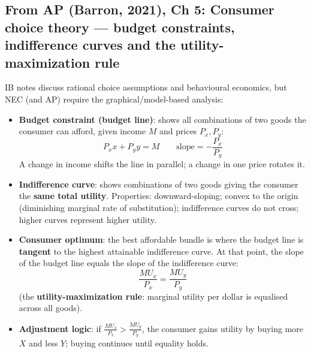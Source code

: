 \documentclass[a4paper,12pt]{article}
\newcommand{\needbold}[1]{\textcolor{red!70!black}{\textbf{#1}}}
\begin{document}
\subsection*{From AP (Barron, 2021), Ch 5: Consumer choice theory --- budget constraints, indifference curves and the utility-maximization rule}\label{sec:add-consumer}
IB notes discuss rational choice assumptions and behavioural economics, but NEC (and AP) require the graphical/model-based analysis:
\begin{itemize}
  \item \needbold{Budget constraint (budget line)}: shows all combinations of two goods the consumer can afford, given income $M$ and prices $P_x, P_y$:
  \[P_x x + P_y y = M \qquad \text{slope} = -\dfrac{P_x}{P_y}\]
  A change in income shifts the line in parallel; a change in one price rotates it.
  \item \needbold{Indifference curve}: shows combinations of two goods giving the consumer the \textbf{same total utility}. Properties: downward-sloping; convex to the origin (diminishing marginal rate of substitution); indifference curves do not cross; higher curves represent higher utility.
  \item \needbold{Consumer optimum}: the best affordable bundle is where the budget line is \textbf{tangent} to the highest attainable indifference curve. At that point, the slope of the budget line equals the slope of the indifference curve:
  \[\dfrac{MU_x}{P_x}=\dfrac{MU_y}{P_y}\]
  (the \needbold{utility-maximization rule}: marginal utility per dollar is equalised across all goods).
  \item \textbf{Adjustment logic}: if $\frac{MU_x}{P_x} > \frac{MU_y}{P_y}$, the consumer gains utility by buying more $X$ and less $Y$; buying continues until equality holds.
\end{itemize}
\end{document}
